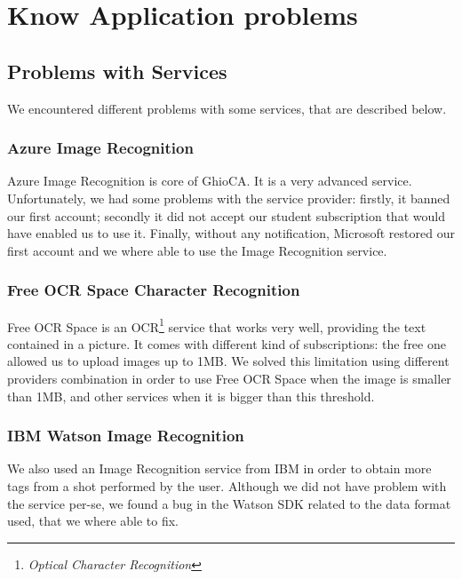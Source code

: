 \section{Know Application problems}

\subsection{Problems with Services}

We encountered different problems with some services, that are described below.

\subsubsection{Azure Image Recognition}

Azure Image Recognition is core of GhioCA. It is a very advanced service.
Unfortunately, we had some problems with the service provider: firstly,
it banned our first account; secondly it did not accept our student
subscription that would have enabled us to use it.
Finally, without any notification, Microsoft restored our first account and we
where able to use the Image Recognition service.

\subsubsection{Free OCR Space Character Recognition}

Free OCR Space is an OCR\footnote{\textit{Optical Character 
Recognition}} service that works very well, providing the text contained in a picture.
It comes with different kind of subscriptions: the free one allowed us to upload
images up to 1MB. 
We solved this limitation using different providers combination in order to use
Free OCR Space when the image is smaller than 1MB, and other services 
when it is bigger than this threshold. %

\subsubsection{IBM Watson Image Recognition}

We also used an Image Recognition service from IBM in order to obtain more tags
from a shot performed by the user. %
Although we did not have problem with the service per-se, we found a bug in the 
Watson SDK related to the data format used, that we where able to fix. %

